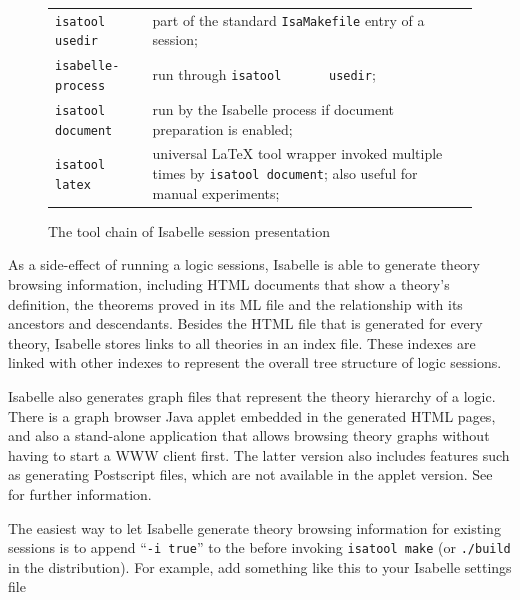 \begin{isabellebody}
\begin{isamarkuptext}
\begin{figure}[htbp]
\begin{center}
\begin{tabular}{lp{}}
      \verb|isatool usedir| & part of the standard \verb|IsaMakefile| entry of a session; \\

      \verb|isabelle-process| & run through \verb|isatool|\isasep\isanewline%
\verb|      usedir|; \\

      \verb|isatool document| & run by the Isabelle process if
      document preparation is enabled; \\

      \verb|isatool latex| & universal {\LaTeX} tool wrapper
      invoked multiple times by \verb|isatool document|; also
      useful for manual experiments; \\

  \end{tabular}
  \caption{The tool chain of Isabelle session presentation} \label{fig:session-tools}
  \end{center}
  \end{figure}%
\end{isamarkuptext}%
\isamarkuptrue%
%
\isamarkuptrue%
%
\begin{isamarkuptext}%

  As a side-effect of running a logic sessions, Isabelle is able to
  generate theory browsing information, including HTML documents that
  show a theory's definition, the theorems proved in its ML file and
  the relationship with its ancestors and descendants.  Besides the
  HTML file that is generated for every theory, Isabelle stores links
  to all theories in an index file. These indexes are linked with
  other indexes to represent the overall tree structure of logic
  sessions.

  Isabelle also generates graph files that represent the theory
  hierarchy of a logic.  There is a graph browser Java applet embedded
  in the generated HTML pages, and also a stand-alone application that
  allows browsing theory graphs without having to start a WWW client
  first.  The latter version also includes features such as generating
  Postscript files, which are not available in the applet version.
  See  for further information.

  \medskip

  The easiest way to let Isabelle generate theory browsing information
  for existing sessions is to append ``\verb|-i true|'' to the
  \hyperlink{setting.ISABELLE-USEDIR-OPTIONS}{\mbox{}} before invoking \verb|isatool make| (or \verb|./build| in the distribution).  For
  example, add something like this to your Isabelle settings file


\end{isamarkuptext}
\end{isabellebody}
